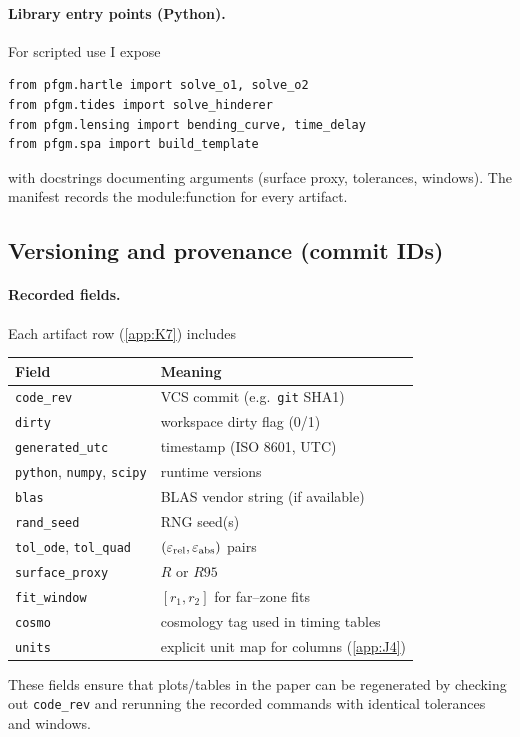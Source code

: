 \documentclass{iopjournal}
\begin{document}
\paragraph{Library entry points (Python).}
For scripted use I expose
\begin{verbatim}
from pfgm.hartle import solve_o1, solve_o2
from pfgm.tides import solve_hinderer
from pfgm.lensing import bending_curve, time_delay
from pfgm.spa import build_template
\end{verbatim}
with docstrings documenting arguments (surface proxy, tolerances, windows). The manifest records the module:function for every artifact.

\subsection{Versioning and provenance (commit IDs)}\label{app:L4}
\paragraph{Recorded fields.}
Each artifact row (\cref{app:K7}) includes
\begin{center}
\begin{tabular}{ll}
\hline
Field & Meaning \\
\hline
\texttt{code\_rev} & VCS commit (e.g.\ \texttt{git} SHA1) \\
\texttt{dirty} & workspace dirty flag (0/1) \\
\texttt{generated\_utc} & timestamp (ISO 8601, UTC) \\
\texttt{python}, \texttt{numpy}, \texttt{scipy} & runtime versions \\
\texttt{blas} & BLAS vendor string (if available) \\
\texttt{rand\_seed} & RNG seed(s) \\
\texttt{tol\_ode}, \texttt{tol\_quad} & $(\varepsilon_{\rm rel},\varepsilon_{\rm abs})$ pairs \\
\texttt{surface\_proxy} & $R$ or $R95$ \\
\texttt{fit\_window} & $[r_1,r_2]$ for far--zone fits \\
\texttt{cosmo} & cosmology tag used in timing tables \\
\texttt{units} & explicit unit map for columns (\cref{app:J4}) \\
\hline
\end{tabular}
\end{center}
These fields ensure that plots/tables in the paper can be regenerated by checking out \texttt{code\_rev} and rerunning the recorded commands with identical tolerances and windows.
\end{document}
